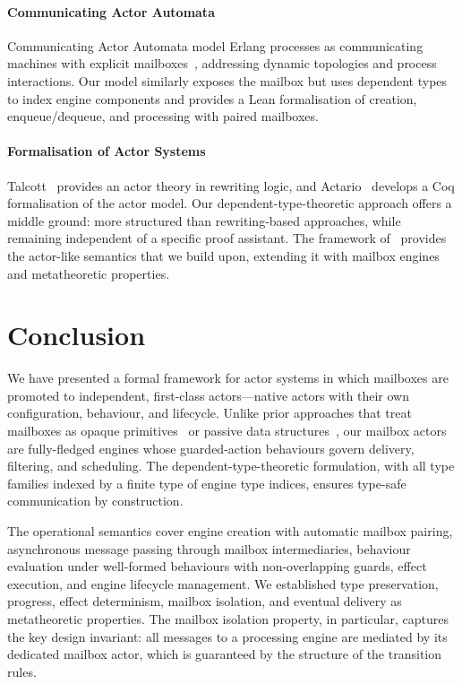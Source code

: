 \documentclass[
  a4paper,        %
  techreport,     %
]{art}
\begin{document}
\paragraph{Communicating Actor Automata}
Communicating Actor Automata model Erlang processes as communicating machines
with explicit mailboxes~\cite{Orchard_2023}, addressing dynamic topologies and
process interactions. Our model similarly exposes the mailbox but uses
dependent types to index engine components and provides a Lean formalisation of
creation, enqueue/dequeue, and processing with paired mailboxes.

\paragraph{Formalisation of Actor Systems}
Talcott~\cite{Talcott1998} provides an actor theory in rewriting logic,
and Actario~\cite{actario} develops a Coq formalisation of the actor model.
Our dependent-type-theoretic approach offers a middle ground: more structured
than rewriting-based approaches, while remaining independent of a specific proof
assistant. The framework of~\cite{art-engines} provides the actor-like
semantics that we build upon, extending it with mailbox engines and
metatheoretic properties.

\section{Conclusion}\label{sec:conclusion}

We have presented a formal framework for actor systems in which mailboxes are
promoted to independent, first-class actors---native actors with their own
configuration, behaviour, and lifecycle. Unlike prior approaches that treat
mailboxes as opaque primitives~\cite{formal-semantics-erlang} or passive data
structures~\cite{kilim-framework}, our mailbox actors are fully-fledged engines
whose guarded-action behaviours govern delivery, filtering, and scheduling.
The dependent-type-theoretic formulation, with all type families indexed by a
finite type of engine type indices, ensures type-safe communication by
construction.

The operational semantics cover engine creation with automatic mailbox pairing,
asynchronous message passing through mailbox intermediaries, behaviour
evaluation under well-formed behaviours with non-overlapping guards, effect
execution, and engine lifecycle management. We established type preservation,
progress, effect determinism, mailbox isolation, and eventual delivery as
metatheoretic properties.
The mailbox isolation property, in particular, captures the key design
invariant: all messages to a processing engine are mediated by its dedicated
mailbox actor, which is guaranteed by the structure of the transition rules.
\end{document}
